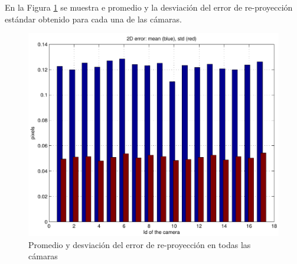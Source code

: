 En la Figura \ref{fig: error reproyeccion} se muestra e promedio y la desviación del error de re-proyección estándar obtenido para cada una de las cámaras.

\begin{figure}[ht!]
\begin{center}
\includegraphics[scale=0.4]{img/calibracion/reprerrors.pdf}
\end{center}

\caption{Promedio y desviación  del error de re-proyección en todas las cámaras }
\label{fig: error reproyeccion}
\end{figure}
  







